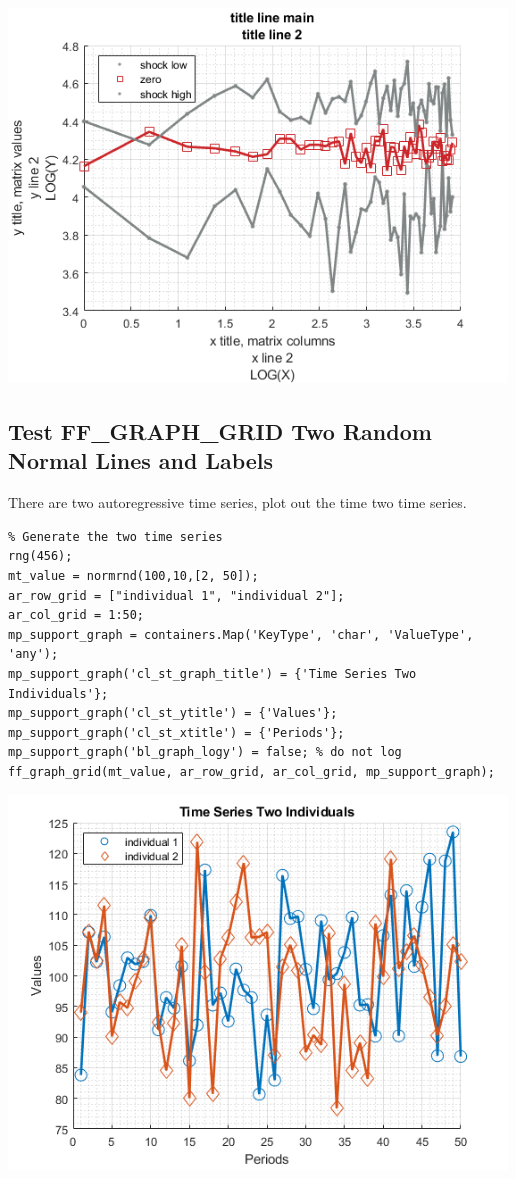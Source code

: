 \documentclass[
]{book}
\begin{document}
\includegraphics[width=5.20833in,height=\textheight]{img/fx_graph_grid_images/figure_3.png}

\hypertarget{test-ff_graph_grid-two-random-normal-lines-and-labels}{%
\subsection{Test FF\_GRAPH\_GRID Two Random Normal Lines and Labels}\label{test-ff_graph_grid-two-random-normal-lines-and-labels}}

There are two autoregressive time series, plot out the time two time
series.

\begin{verbatim}
% Generate the two time series
rng(456);
mt_value = normrnd(100,10,[2, 50]);
ar_row_grid = ["individual 1", "individual 2"];
ar_col_grid = 1:50;
mp_support_graph = containers.Map('KeyType', 'char', 'ValueType', 'any');
mp_support_graph('cl_st_graph_title') = {'Time Series Two Individuals'};
mp_support_graph('cl_st_ytitle') = {'Values'};
mp_support_graph('cl_st_xtitle') = {'Periods'};
mp_support_graph('bl_graph_logy') = false; % do not log
ff_graph_grid(mt_value, ar_row_grid, ar_col_grid, mp_support_graph);
\end{verbatim}

\includegraphics[width=5.20833in,height=\textheight]{img/fx_graph_grid_images/figure_4.png}
\end{document}

